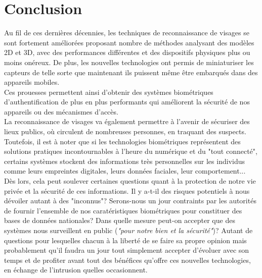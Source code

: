\section{Conclusion}
Au fil de ces dernières décennies, les techniques de reconnaissance de visages se sont fortement améliorées proposant nombre de méthodes analysant des modèles 2D et 3D, avec des performances différentes et des dispositifs physiques plus ou moins onéreux. De plus, les nouvelles technologies ont permis de miniaturiser les capteurs de telle sorte que maintenant ils puissent même être embarqués dans des appareils mobiles.
\\Ces prouesses permettent ainsi d'obtenir des systèmes biométriques d'authentification de plus en plus performants qui améliorent la sécurité de nos appareils ou des mécanismes d'accès.
\\La reconnaissance de visages va également permettre à l'avenir de sécuriser des lieux publics, où circulent de nombreuses personnes, en traquant des suspects.
\\Toutefois, il est à noter que si les technologies biométriques représentent des solutions pratiques incontournables à l'heure du numérique et du "tout connecté", certains systèmes stockent des informations très personnelles sur les individus comme leurs empreintes digitales, leurs données faciales, leur comportement... Dès lors, cela peut soulever certaines questions quant à la protection de notre vie privée et la sécurité de ces informations. Il y a-t-il des risques potentiels à nous dévoiler autant à des "inconnus"? Serons-nous un jour contraints par les autorités de fournir l'ensemble de nos caratéristiques biométriques pour constituer des bases de données nationales? Dans quelle mesure peut-on accepter que des systèmes nous surveillent en public (\textit{"pour notre bien et la sécurité"})? Autant de questions pour lesquelles chacun à la liberté de se faire sa propre opinion mais probablement qu'il faudra un jour tout simplement accepter d'évoluer avec son temps et de profiter avant tout des bénéfices qu'offre ces nouvelles technologies, en échange de l'intrusion quelles occasionnent.